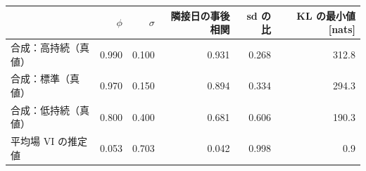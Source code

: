 \begin{tabular}{lrrrrr}
\toprule
 & $\phi$ & $\sigma$ & 隣接日の事後相関 & sd の比 & KL の最小値 [nats] \\
\midrule
合成：高持続（真値） & 0.990 & 0.100 & 0.931 & 0.268 & 312.8 \\
合成：標準（真値） & 0.970 & 0.150 & 0.894 & 0.334 & 294.3 \\
合成：低持続（真値） & 0.800 & 0.400 & 0.681 & 0.606 & 190.3 \\
\addlinespace
平均場 VI の推定値 & 0.053 & 0.703 & 0.042 & 0.998 & 0.9 \\
\bottomrule
\end{tabular}
